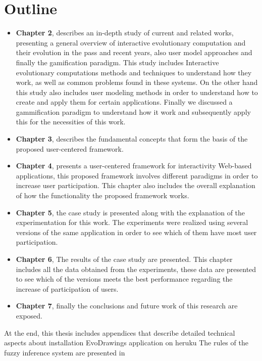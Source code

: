 \section{Outline}

\begin{itemize}
\item \textbf{Chapter 2}, describes an in-depth study of current and related
works, presenting a general overview of interactive evolutionary computation and
their evolution in the pass and recent years, also user model approaches and
finally the gamification paradigm. This study includes Interactive evolutionary
computations methods and techniques to understand how they work, as well as
common problems found in these systems. On the other hand this study also includes user
modeling methods in order to understand how to create and apply them for certain
applications. Finally we discussed a gammification paradigm to
understand how it work and subsequently apply this for the necessities of this
work.

\item \textbf{Chapter 3}, describes the fundamental
concepts that form the basis of the proposed user-centered framework.

\item \textbf{Chapter 4}, presents a user-centered framework for interactivity
Web-based applications, this proposed framework involves different paradigms in
order to increase user participation. This chapter also includes the overall
explanation of how the functionality the proposed framework works.

\item \textbf{Chapter 5}, the case study is presented along with the
explanation of the experimentation for this work. The experiments were realized
using several versions of the same application in order to see which of them
have most user participation.

\item \textbf{Chapter 6}, The results of the case study are presented. This
chapter includes all the data obtained from the experiments, these data are
presented to see which of the versions meets the best performance regarding the
increase of participation of users.

\item \textbf{Chapter 7}, finally the conclusions and future work of this
research are exposed.
\end{itemize}

At the end, this thesis includes appendices that describe
detailed technical aspects about installation EvoDrawings application on heruku
The rules of the fuzzy inference system are presented in  %
